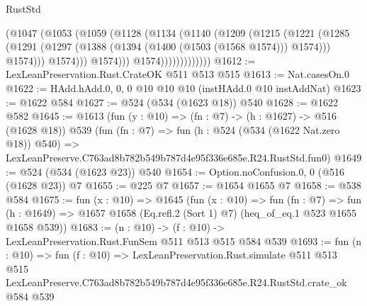 \begin{lexlean}{RustStd}
\begin{coremodule}
                          (@1047
                            (@1053
                              (@1059
                                (@1128
                                  (@1134
                                    (@1140
                                      (@1209
                                        (@1215
                                          (@1221
                                            (@1285
                                              (@1291
                                                (@1297
                                                  (@1388
                                                    (@1394 (@1400 (@1503 (@1568 @1574))) @1574)))
                                                @1574)))
                                          @1574)))
                                    @1574)))
                              @1574)))))))))))))
@1612 := LexLeanPreservation.Rust.CrateOK @511 @513 @515
@1613 := Nat.casesOn.{0}
@1622 := HAdd.hAdd.{0, 0, 0} @10 @10 @10 (instHAdd.{0} @10 instAddNat)
@1623 := @1622 @584
@1627 := @524 (@534 (@1623 @18)) @540
@1628 := @1622 @582
@1645 := @1613
    (fun (y : @10) => (fn : @7) -> (h : @1627) -> @516 (@1628 @18))
    @539
    (fun (fn : @7) =>
    fun (h : @524 (@534 (@1622 Nat.zero @18)) @540) =>
    LexLeanPreserve.C763ad8b782b549b787d4e95f336e685e.R24.RustStd.fun0)
@1649 := @524 (@534 (@1623 @23)) @540
@1654 := Option.noConfusion.{0, 0} (@516 (@1628 @23)) @7
@1655 := @225 @7
@1657 := @1654 @1655 @7
@1658 := @538 @584
@1675 := fun (x : @10) =>
  @1645
    (fun (x : @10) =>
    fun (fn : @7) =>
    fun (h : @1649) => @1657 @1658 (Eq.refl.{2} (Sort 1) @7) (heq_of_eq.{1} @523 @1655 @1658 @539))
@1683 := (n : @10) -> (f : @10) -> LexLeanPreservation.Rust.FunSem @511 @513 @515 @584 @539
@1693 := fun (n : @10) =>
  fun (f : @10) =>
  LexLeanPreservation.Rust.simulate
    @511
    @513
    @515
    LexLeanPreserve.C763ad8b782b549b787d4e95f336e685e.R24.RustStd.crate_ok
    @584
    @539
\end{coremodule}
\end{lexlean}

